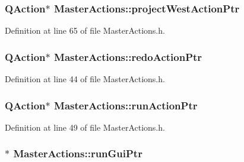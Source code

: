 \hypertarget{class_master_actions_aa4160469d2e9a840448c49e95bcfa9e5}{
\subsubsection[{project\-West\-Action\-Ptr}]{\setlength{\rightskip}{0pt plus 5cm}Q\-Action$\ast$ Master\-Actions\-::project\-West\-Action\-Ptr\hspace{0.3cm}{\ttfamily [private]}}}\label{class_master_actions_aa4160469d2e9a840448c49e95bcfa9e5}


Definition at line 65 of file Master\-Actions.\-h.

\hypertarget{class_master_actions_a7936a9bf0e7418cd864b2fb1ab786d09}{
\subsubsection[{redo\-Action\-Ptr}]{\setlength{\rightskip}{0pt plus 5cm}Q\-Action$\ast$ Master\-Actions\-::redo\-Action\-Ptr\hspace{0.3cm}{\ttfamily [private]}}}\label{class_master_actions_a7936a9bf0e7418cd864b2fb1ab786d09}


Definition at line 44 of file Master\-Actions.\-h.

\hypertarget{class_master_actions_a3377fe0ddc45ce50119766c8a903c039}{
\subsubsection[{run\-Action\-Ptr}]{\setlength{\rightskip}{0pt plus 5cm}Q\-Action$\ast$ Master\-Actions\-::run\-Action\-Ptr\hspace{0.3cm}{\ttfamily [private]}}}\label{class_master_actions_a3377fe0ddc45ce50119766c8a903c039}


Definition at line 49 of file Master\-Actions.\-h.

\hypertarget{class_master_actions_ad7ff295f2e3067697e290afc4f0fd0df}{
\subsubsection[{run\-Gui\-Ptr}]{$\ast$ Master\-Actions\-::run\-Gui\-Ptr\hspace{0.3cm}{\ttfamily [private]}}}\label{class_master_actions_ad7ff295f2e3067697e290afc4f0fd0df}


